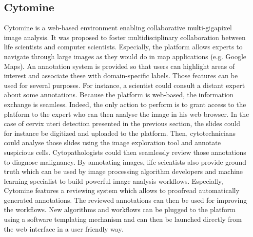 \subsection{Cytomine} 
\label{sssec:detect_cytomine}
Cytomine \cite{maree2016collaborative} is a web-based environment enabling collaborative multi-gigapixel image analysis. It was proposed to foster multidisciplinary collaboration between life scientists and computer scientists. Especially, the platform allows experts to navigate through large images as they would do in map applications (e.g. Google Maps). An annotation system is provided so that users can highlight areas of interest and associate these with domain-specific labels. Those features can be used for several purposes. For instance, a scientist could consult a distant expert about some annotations. Because the platform is web-based, the information exchange is seamless. Indeed, the only action to perform is to grant access to the platform to the expert who can then analyse the image in his web browser. In the case of cervix uteri detection presented in the previous section, the slides could for instance be digitized and uploaded to the platform. Then, cytotechnicians could analyse those slides using the image exploration tool and annotate suspicious cells. Cytopathologists could then seamlessly review those annotations to diagnose malignancy. By annotating images, life scientists also provide ground truth which can be used by image processing algorithm developers and machine learning specialist to build powerful image analysis workflows. Especially, Cytomine features a reviewing system which allows to proofread automatically generated annotations. The reviewed annotations can then be used for improving the workflows. New algorithms and workflows can be plugged to the platform using a software templating mechanism and can then be launched directly from the web interface in a user friendly way.  

